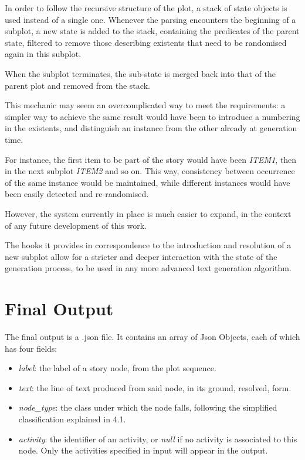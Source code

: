 \documentclass[12pt,a4paper,oneside]{report}
\begin{document}
In order to follow the recursive structure of the plot, a stack of state objects is used instead of a single one. Whenever the parsing encounters the beginning of a subplot, a new state is added to the stack, containing the predicates of the parent state, filtered to remove those describing existents that need to be randomised again in this subplot.

When the subplot terminates, the sub-state is merged back into that of the parent plot and removed from the stack.

\bigskip

This mechanic may seem an overcomplicated way to meet the requirements: a simpler way to achieve the same result would have been to introduce a numbering in the existents, and distinguish an instance from the other already at generation time.

For instance, the first item to be part of the story would have been \textit{ITEM1}, then in the next subplot \textit{ITEM2} and so on. This way, consistency between occurrence of the same instance would be maintained, while different instances would have been easily detected and re-randomised.

\bigskip

However, the system currently in place is much easier to expand, in the context of any future development of this work. 

The hooks it provides in correspondence to the introduction and resolution of a new subplot allow for a stricter and deeper interaction with the state of the generation process, to be used in any more advanced text generation algorithm.

\pagebreak

\section{Final Output}
The final output is a .json file. It contains an array of Json Objects, each of which has four fields:

\begin{itemize}\setlength{\itemsep}{0pt}
\item \textit{label}: the label of a story node, from the plot sequence. 
\item \textit{text}: the line of text produced from said node, in its ground, resolved, form.
\item \textit{node\_type}: the class under which the node falls, following the simplified classification explained in 4.1.
\item \textit{activity}: the identifier of an activity, or \textit{null} if no activity is associated to this node. Only the activities specified in input will appear in the output.
\end{itemize}
\end{document}
